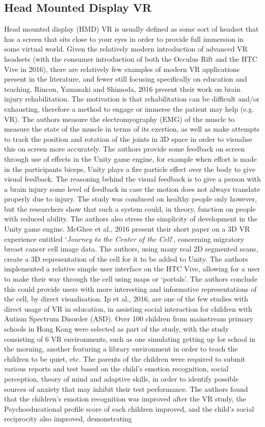 \documentclass[11pt]{report}
\begin{document}
\subsection{Head Mounted Display VR}
Head mounted display (HMD) VR is usually defined as some sort of headset that has a screen that sits close to your eyes in order to provide full immersion in some virtual world. Given the relatively modern introduction of advanced VR headsets (with the consumer introduction of both the Occulus Rift and the HTC Vive in 2016), there are relatively few examples of modern VR applications present in the literature, and fewer still focusing specifically on education and teaching. Rincon, Yamasaki and Shimoda, 2016 present their work on brain injury rehabilitation. The motivation is that rehabilitation can be difficult and/or exhausting, therefore a method to engage or immerse the patient may help (e.g. VR). The authors measure the electromyography (EMG) of the muscle to measure the state of the muscle in terms of its exertion, as well as make attempts to track the position and rotation of the joints in 3D space in order to visualise this on screen more accurately. The authors provide some feedback on screen through use of effects in the Unity game engine, for example when effort is made in the participants biceps, Unity plays a fire particle effect over the body to give visual feedback. The reasoning behind the visual feedback is to give a person with a brain injury some level of feedback in case the motion does not always translate properly due to injury. The study was conduced on healthy people only however, but the researchers show that such a system could, in theory, function on people with reduced ability. The authors also stress the simplicity of development in the Unity game engine. McGhee et al., 2016 present their short paper on a 3D VR experience entitled `\textit{Journey to the Center of the Cell}', concerning migratory breast cancer cell image data. The authors, using many real 2D segmented scans, create a 3D representation of the cell for it to be added to Unity. The authors implemented a relative simple user interface on the HTC Vive, allowing for a user to make their way through the cell using maps or `portals'. The authors conclude this could provide users with more interesting and informative representations of the cell, by direct visualisation. Ip et al., 2016, are one of the few studies with direct usage of VR in education, in assisting social interaction for children with Autism Spectrum Disorder (ASD). Over 100 children from mainstream primary schools in Hong Kong were selected as part of the study, with the study consisting of 6 VR environments, such as one simulating getting up for school in the morning, another featuring a library environment in order to teach the children to be quiet, etc. The parents of the children were required to submit various reports and test based on the child's emotion recognition, social perception, theory of mind and adaptive skills, in order to identify possible sources of anxiety that may inhibit their test performance. The authors found that the children's emotion recognition was improved after the VR study, the Psychoeducational profile score of each children improved, and the child's social reciprocity also improved, demonstrating 
\end{document}
